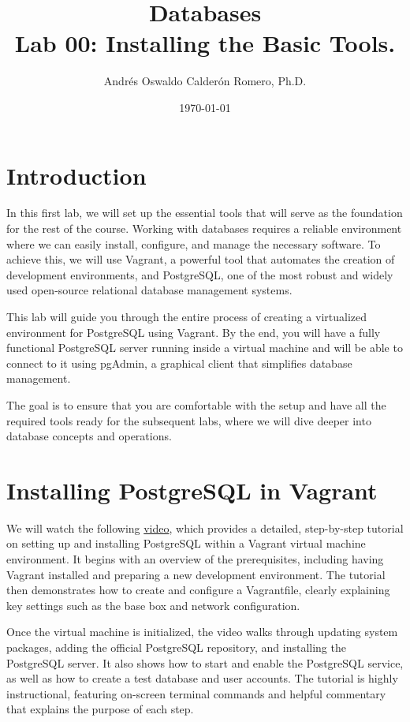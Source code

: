 \documentclass{article}
\title{Databases \\ Lab 00: Installing the Basic Tools.}
\author{Andrés Oswaldo Calderón Romero, Ph.D.}
\date{\today}
\begin{document}
\maketitle

\section{Introduction}
In this first lab, we will set up the essential tools that will serve as the foundation for the rest of the course. Working with databases requires a reliable environment where we can easily install, configure, and manage the necessary software. To achieve this, we will use Vagrant, a powerful tool that automates the creation of development environments, and PostgreSQL, one of the most robust and widely used open-source relational database management systems.

This lab will guide you through the entire process of creating a virtualized environment for PostgreSQL using Vagrant. By the end, you will have a fully functional PostgreSQL server running inside a virtual machine and will be able to connect to it using pgAdmin, a graphical client that simplifies database management.

The goal is to ensure that you are comfortable with the setup and have all the required tools ready for the subsequent labs, where we will dive deeper into database concepts and operations.

\section{Installing PostgreSQL in Vagrant} \label{sec:installing}

We will watch the following \href{https://youtu.be/BJ37nFhtN8Y?si=PgWnXo-vMv7fxT48}{video}, which provides a detailed, step-by-step tutorial on setting up and installing PostgreSQL within a Vagrant virtual machine environment. It begins with an overview of the prerequisites, including having Vagrant installed and preparing a new development environment. The tutorial then demonstrates how to create and configure a Vagrantfile, clearly explaining key settings such as the base box and network configuration.

Once the virtual machine is initialized, the video walks through updating system packages, adding the official PostgreSQL repository, and installing the PostgreSQL server. It also shows how to start and enable the PostgreSQL service, as well as how to create a test database and user accounts. The tutorial is highly instructional, featuring on-screen terminal commands and helpful commentary that explains the purpose of each step.
\end{document}
